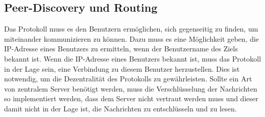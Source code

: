 \subsection{Peer-Discovery und Routing}
\label{subsec:peer_discovery}

Das Protokoll muss es den Benutzern ermöglichen, sich gegenseitig zu finden, um miteinander kommunizieren zu können. Dazu muss es eine Möglichkeit geben, die IP-Adresse eines Benutzers zu ermitteln, wenn der Benutzername des Ziels bekannt ist. Wenn die IP-Adresse eines Benutzers bekannt ist, muss das Protokoll in der Lage sein, eine Verbindung zu diesem Benutzer herzustellen. Dies ist notwendig, um die Dezentralität des Protokolls zu gewährleisten. Sollte ein Art von zentralem Server benötigt werden, muss die Verschlüsselung der Nachrichten so implementiert werden, dass dem Server nicht vertraut werden muss und dieser damit nicht in der Lage ist, die Nachrichten zu entschlüsseln und zu lesen.